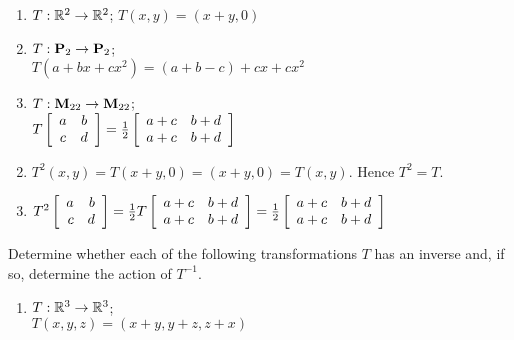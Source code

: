\begin{multicols}{2}
\begin{ex}
\begin{enumerate}[label={\alph*.}]
\item $T : \mathbb{R}^2 \to \mathbb{R}^2$; $T(x, y) = (x + y, 0)$

\item $T : \textbf{P}_{2} \to \textbf{P}_{2}$; \\ $T(a + bx + cx^{2}) = (a + b - c) + cx + cx^{2}$

\item $T : \textbf{M}_{22} \to \textbf{M}_{22}$; \\ $T\left[ \begin{array}{cc}
a & b \\
c & d
\end{array} \right] = \tfrac{1}{2}\left[ \begin{array}{cc}
a + c & b + d \\
a + c & b + d
\end{array} \right]$

\end{enumerate}
\begin{sol}
\begin{enumerate}[label={\alph*.}]
\setcounter{enumi}{1}
\item $T^{2}(x, y) = T(x + y, 0) = (x + y, 0) = T(x, y)$. Hence $T^{2} = T$.

\setcounter{enumi}{3}
\item $T^2 \left[ \begin{array}{rr}
a & b \\
c & d
\end{array} \right] = \tfrac{1}{2}T\left[ \begin{array}{cc}
a + c & b + d \\
a + c & b + d
\end{array} \right]  = \tfrac{1}{2}\left[ \begin{array}{cc}
a + c & b + d \\
a + c & b + d
\end{array} \right]$

\end{enumerate}
\end{sol}
\end{ex}

\begin{ex}
Determine whether each of the following transformations $T$ has an inverse and, if so, determine the action of $T^{-1}$.


\begin{enumerate}[label={\alph*.}]
\item $T : \mathbb{R}^3 \to \mathbb{R}^3$; \\ $T(x, y, z) = (x + y, y + z, z + x)$


\end{enumerate}
\end{ex}
\end{multicols}
